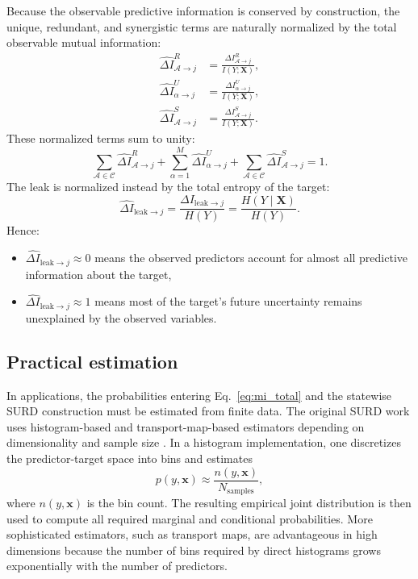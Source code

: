 \documentclass[fleqn,usenatbib]{mnras}
\begin{document}
Because the observable predictive information is conserved by construction, the unique, redundant, and synergistic terms are naturally normalized by the total observable mutual information:
\begin{equation}
\begin{aligned}
\widehat{\Delta I}_{\mathcal{A}\to j}^{R}
&=\frac{\Delta I_{\mathcal{A}\to j}^{R}}{I(Y;\mathbf{X})},\\
\widehat{\Delta I}_{\alpha\to j}^{U}
&=\frac{\Delta I_{\alpha\to j}^{U}}{I(Y;\mathbf{X})},\\
\widehat{\Delta I}_{\mathcal{A}\to j}^{S}
&=\frac{\Delta I_{\mathcal{A}\to j}^{S}}{I(Y;\mathbf{X})}.
\end{aligned}
\label{eq:normalized_atoms}
\end{equation}
These normalized terms sum to unity:
\begin{equation}
\sum_{\mathcal{A}\in\mathcal{C}}\widehat{\Delta I}_{\mathcal{A}\to j}^{R}
+
\sum_{\alpha=1}^{M}\widehat{\Delta I}_{\alpha\to j}^{U}
+
\sum_{\mathcal{A}\in\mathcal{C}}\widehat{\Delta I}_{\mathcal{A}\to j}^{S}
=1.
\end{equation}
The leak is normalized instead by the total entropy of the target:
\begin{equation}
\widehat{\Delta I}_{\mathrm{leak}\to j}
=
\frac{\Delta I_{\mathrm{leak}\to j}}{H(Y)}
=
\frac{H(Y\mid\mathbf{X})}{H(Y)}.
\label{eq:normalized_leak}
\end{equation}
Hence:
\begin{itemize}
    \item \(\widehat{\Delta I}_{\mathrm{leak}\to j}\approx 0\) means the observed predictors account for almost all predictive information about the target,
    \item \(\widehat{\Delta I}_{\mathrm{leak}\to j}\approx 1\) means most of the target's future uncertainty remains unexplained by the observed variables.
\end{itemize}

\subsection{Practical estimation}

In applications, the probabilities entering Eq.~\eqref{eq:mi_total} and the statewise SURD construction must be estimated from finite data. The original SURD work uses histogram-based and transport-map-based estimators depending on dimensionality and sample size \cite{MartinezSanchez2024SURD}. In a histogram implementation, one discretizes the predictor-target space into bins and estimates
\begin{equation}
p(y,\mathbf{x}) \approx \frac{n(y,\mathbf{x})}{N_{\mathrm{samples}}},
\end{equation}
where \(n(y,\mathbf{x})\) is the bin count. The resulting empirical joint distribution is then used to compute all required marginal and conditional probabilities. More sophisticated estimators, such as transport maps, are advantageous in high dimensions because the number of bins required by direct histograms grows exponentially with the number of predictors.
\end{document}
